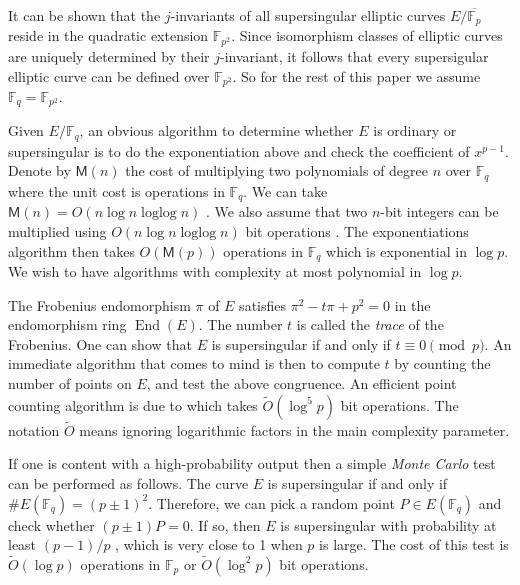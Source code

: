 \documentclass[review]{elsarticle}
\theoremstyle{plain}
\theoremstyle{definition}
\newcommand{\tildO}{\tilde{O}}
\DeclareMathOperator{\ringofend}{End} %
\DeclareMathOperator{\loglog}{loglog}
\def\F{\ensuremath{\mathbb{F}}}
\def\MM{\ensuremath{\mathsf{M}}}
\begin{document}
It can be shown that the $j$-invariants of all supersingular elliptic curves $E / \overline{\F_p}$ 
reside in the quadratic extension $\F_{p^2}$. Since isomorphism classes of elliptic curves are 
uniquely determined by their $j$-invariant, it follows that every supersigular elliptic curve can 
be defined over $\F_{p^2}$. So for the rest of this paper we assume $\F_q = \F_{p^2}$. 

Given $E / \F_q$, an obvious algorithm to determine whether $E$ is ordinary or supersingular is to 
do the exponentiation above and check the coefficient of $x^{p - 1}$. Denote by $\MM(n)$ the cost 
of multiplying two polynomials of degree $n$ over $\F_q$ where the unit cost is operations in 
$\F_q$. We can take $\MM(n) = O(n\log n \loglog n)$ \cite{vzGG}. We also assume that two $n$-bit 
integers can be multiplied using $O(n\log n \loglog n)$ bit operations \cite{vzGG}. The 
exponentiations algorithm then takes $O(\MM(p))$ operations in $\F_q$ which is exponential in $\log 
p$. We wish to have algorithms with complexity at most polynomial in $\log p$.

The Frobenius endomorphism $\pi$ of $E$ satisfies $\pi^2 - t\pi + p^2 = 0$ in the endomorphism ring 
$\ringofend(E)$. The number $t$ is called the \textit{trace} of the Frobenius. One can show that 
$E$ is supersingular if and only if $t \equiv 0 \pmod{p}$. An immediate algorithm that comes to 
mind is then to compute $t$ by counting the number of points on $E$, and test the above congruence. 
An efficient point counting algorithm is due to \cite{schoof85} which takes $\tildO(\log^5 p)$ bit 
operations. The notation $\tildO$ means ignoring logarithmic factors in the main complexity 
parameter.

If one is content with a high-probability output then a simple \textit{Monte Carlo} test can be 
performed as follows. The curve $E$ is supersingular if and only if $\#E(\F_q) = (p \pm 1)^2$. 
Therefore, we can pick a random point $P \in E(\F_q)$ and check whether $(p \pm 1)P = 0$. If so, 
then $E$ is supersingular with probability at least $(p - 1) / p$ \cite[Prop. 2]{sutherland2012}, 
which is very close to 1 when $p$ is large. The cost of this test is $\tildO(\log p)$ operations in 
$\F_p$ or $\tildO(\log^2 p)$ bit operations.
\end{document}
